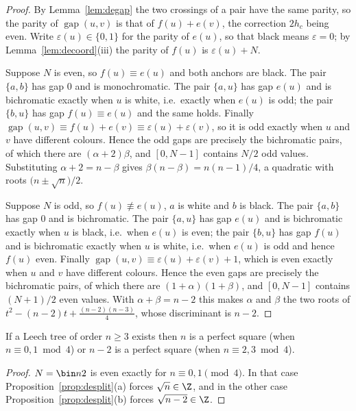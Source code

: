 \begin{proof}
By Lemma~\ref{lem:degap} the two crossings of a pair have the same parity, so
the parity of $\operatorname{gap}(u,v)$ is that of $f(u)+e(v)$, the correction
$2h_c$ being even.  Write $\varepsilon(u)\in\{0,1\}$ for the parity of $e(u)$,
so that black means $\varepsilon=0$; by Lemma~\ref{lem:decoord}(iii) the parity
of $f(u)$ is $\varepsilon(u)+N$.

Suppose $N$ is even, so $f(u)\equiv e(u)$ and both anchors are black.  The pair
$\{a,b\}$ has gap $0$ and is monochromatic.  The pair $\{a,u\}$ has gap $e(u)$
and is bichromatic exactly when $u$ is white, i.e.\ exactly when $e(u)$ is odd;
the pair $\{b,u\}$ has gap $f(u)\equiv e(u)$ and the same holds.  Finally
$\operatorname{gap}(u,v)\equiv f(u)+e(v)\equiv\varepsilon(u)+\varepsilon(v)$, so
it is odd exactly when $u$ and $v$ have different colours.  Hence the odd gaps
are precisely the bichromatic pairs, of which there are $(\alpha+2)\beta$, and
$[0,N-1]$ contains $N/2$ odd values.  Substituting $\alpha+2=n-\beta$ gives
$\beta(n-\beta)=n(n-1)/4$, a quadratic with roots $\bigl(n\pm\sqrt n\bigr)/2$.

Suppose $N$ is odd, so $f(u)\not\equiv e(u)$, $a$ is white and $b$ is black.
The pair $\{a,b\}$ has gap $0$ and is bichromatic.  The pair $\{a,u\}$ has gap
$e(u)$ and is bichromatic exactly when $u$ is black, i.e.\ when $e(u)$ is even;
the pair $\{b,u\}$ has gap $f(u)$ and is bichromatic exactly when $u$ is white,
i.e.\ when $e(u)$ is odd and hence $f(u)$ even.  Finally
$\operatorname{gap}(u,v)\equiv\varepsilon(u)+\varepsilon(v)+1$, which is even
exactly when $u$ and $v$ have different colours.  Hence the even gaps are
precisely the bichromatic pairs, of which there are $(1+\alpha)(1+\beta)$, and
$[0,N-1]$ contains $(N+1)/2$ even values.  With $\alpha+\beta=n-2$ this makes
$\alpha$ and $\beta$ the two roots of $t^2-(n-2)t+\tfrac{(n-2)(n-3)}4$, whose
discriminant is $n-2$.
\end{proof}

\begin{corollary}\label{cor:detaylor}
If a Leech tree of order $n\ge3$ exists then $n$ is a perfect square (when
$n\equiv0,1\bmod4$) or $n-2$ is a perfect square (when $n\equiv2,3\bmod4$).
\end{corollary}

\begin{proof}
$N=\bin n2$ is even exactly for $n\equiv0,1\pmod4$.  In that case
Proposition~\ref{prop:desplit}(a) forces $\sqrt n\in\Z$, and in the other case
Proposition~\ref{prop:desplit}(b) forces $\sqrt{n-2}\in\Z$.
\end{proof}

